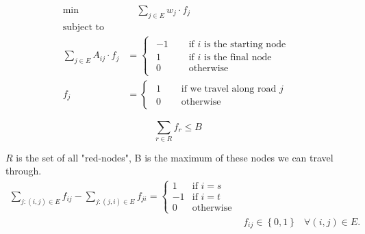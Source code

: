 \documentclass{article}
\begin{document}
\[
    \begin{aligned}
        \min&\quad \sum_{j\in E} w_j\cdot f_j\\
        \text{subject to}&\\
        \sum_{j\in E} A_{ij}\cdot f_j &= 
        \begin{cases}
            \begin{aligned}
                -1 \quad & \textrm{ if $i$ is the starting node} \\
                1 \quad &\textrm{ if $i$ is the final node} \\
                0 \quad & \textrm{ otherwise}
            \end{aligned}
        \end{cases} \\
        f_j &= \begin{cases}
            \begin{aligned}
                1 \quad &\textrm{ if we travel along road $j$} \\
                0 \quad & \textrm{ otherwise}
            \end{aligned}
        \end{cases}
    \end{aligned} 
\]

\[
    \sum_{r \in R} f_r \leq B
\]

$R$ is the set of all "red-nodes", B is the maximum of these nodes we can travel through.
\[
\begin{aligned}
\sum\limits_{j: \left(i,j\right)\in E} f_{ij} - \sum\limits_{j: \left(j,i\right)\in E} f_{ji} = \begin{cases} 1 & \text{if $i=s$} \\ -1 & \text{if $i=t$} \\ 0 & \text{otherwise} \end{cases} \\
	 & f_{ij} \in \left\{0,1\right\} & \forall \left(i,j\right)\in E.
	\end{aligned}
\]
\end{document}

